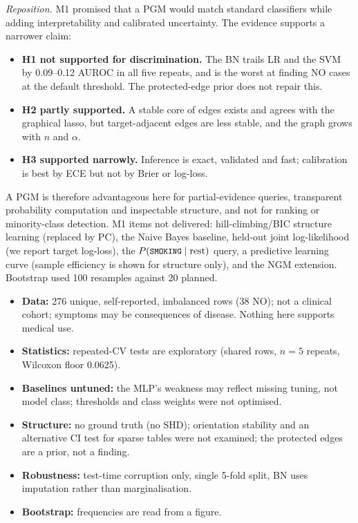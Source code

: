 \documentclass[10pt,twocolumn,letterpaper]{article}
\makeatletter
\renewcommand\section{\@startsection{section}{1}{\z@}{1.5ex plus 0.5ex minus 0.2ex}{1ex plus 0.2ex}{\centering\normalfont\footnotesize\scshape}}
\newcommand{\us}{\textunderscore\allowbreak}
\newcommand{\var}[1]{{\small\ttfamily\let\_\us #1}}
\makeatother
\begin{document}
\emph{Reposition.} M1 promised that a PGM would match standard classifiers while adding interpretability and calibrated uncertainty. The evidence supports a narrower claim:
\begin{itemize}\itemsep0pt
\item \textbf{H1 not supported for discrimination.} The BN trails LR and the SVM by 0.09--0.12 AUROC in all five repeats, and is the worst at finding NO cases at the default threshold. The protected-edge prior does not repair this.
\item \textbf{H2 partly supported.} A stable core of edges exists and agrees with the graphical lasso, but target-adjacent edges are less stable, and the graph grows with $n$ and $\alpha$.
\item \textbf{H3 supported narrowly.} Inference is exact, validated and fast; calibration is best by ECE but not by Brier or log-loss.
\end{itemize}
A PGM is therefore advantageous here for partial-evidence queries, transparent probability computation and inspectable structure, and not for ranking or minority-class detection. M1 items not delivered: hill-climbing/BIC structure learning (replaced by PC), the Naive Bayes baseline, held-out joint log-likelihood (we report target log-loss), the $P(\text{\var{SMOKING}}\mid\text{rest})$ query, a predictive learning curve (sample efficiency is shown for structure only), and the NGM extension. Bootstrap used 100 resamples against 20 planned.

\section{Limitations}
\begin{itemize}\itemsep0pt
\item \textbf{Data:} 276 unique, self-reported, imbalanced rows (38 NO); not a clinical cohort; symptoms may be consequences of disease. Nothing here supports medical use.
\item \textbf{Statistics:} repeated-CV tests are exploratory (shared rows, $n=5$ repeats, Wilcoxon floor 0.0625).
\item \textbf{Baselines untuned:} the MLP's weakness may reflect missing tuning, not model class; thresholds and class weights were not optimised.
\item \textbf{Structure:} no ground truth (no SHD); orientation stability and an alternative CI test for sparse tables were not examined; the protected edges are a prior, not a finding.
\item \textbf{Robustness:} test-time corruption only, single 5-fold split, BN uses imputation rather than marginalisation.
\item \textbf{Bootstrap:} frequencies are read from a figure.
\end{itemize}
\end{document}
